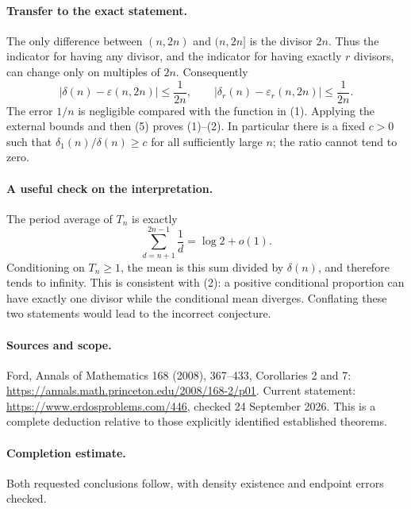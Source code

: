 \paragraph{Transfer to the exact statement.}
The only difference between \((n,2n)\) and \((n,2n]\) is the divisor
\(2n\). Thus the indicator for having any divisor, and the indicator
for having exactly \(r\) divisors, can change only on multiples of \(2n\).
Consequently
\[
 |\delta(n)-\varepsilon(n,2n)|\leq\frac1{2n},\qquad
 |\delta_r(n)-\varepsilon_r(n,2n)|\leq\frac1{2n}.
 \tag{5}
\]
The error \(1/n\) is negligible compared with the function in (1).
Applying the external bounds and then (5) proves (1)--(2).
In particular there is a fixed \(c>0\) such that
\(\delta_1(n)/\delta(n)\geq c\) for all sufficiently large \(n\);
the ratio cannot tend to zero.

\paragraph{A useful check on the interpretation.}
The period average of \(T_n\) is exactly
\[
 \sum_{d=n+1}^{2n-1}\frac1d=\log2+o(1).
\]
Conditioning on \(T_n\geq1\), the mean is this sum divided by
\(\delta(n)\), and therefore tends to infinity.
This is consistent with (2): a positive conditional proportion can
have exactly one divisor while the conditional mean diverges.
Conflating these two statements would lead to the incorrect conjecture.

\paragraph{Sources and scope.}
Ford, Annals of Mathematics 168 (2008), 367--433, Corollaries 2 and 7:
\url{https://annals.math.princeton.edu/2008/168-2/p01}.
Current statement: \url{https://www.erdosproblems.com/446},
checked 24 September 2026. This is a complete deduction relative to
those explicitly identified established theorems.

\paragraph{Completion estimate.}
Both requested conclusions follow, with density existence and endpoint errors checked.
